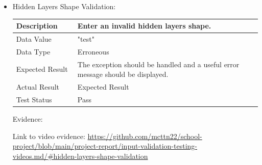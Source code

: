 \documentclass[./project-report/src/latex/project-report.tex]{subfiles}
\begin{document}
\begin{itemize}
\begin{itemize}
        \item Hidden Layers Shape Validation: \newline\newline
			\begin{tabular}{|p{0.25\linewidth}|p{0.75\linewidth}|}
				\hline
				Description & Enter an invalid hidden layers shape. \\
				\hline
				Data Value & "test" \\
				\hline
				Data Type & Erroneous \\
				\hline
				Expected Result & The exception should be handled and a useful error message should be displayed. \\
				\hline
				Actual Result & Expected Result \\
				\hline
				Test Status & Pass \\
				\hline
			\end{tabular}

			\vspace{5mm}

			Evidence:
			\begin{figure}[h!]
			\centering
			\end{figure}

			Link to video evidence: \url{https://github.com/mcttn22/school-project/blob/main/project-report/input-validation-testing-videos.md/#hidden-layers-shape-validation}
    \end{itemize}

    \pagebreak


\end{itemize}
\end{document}
